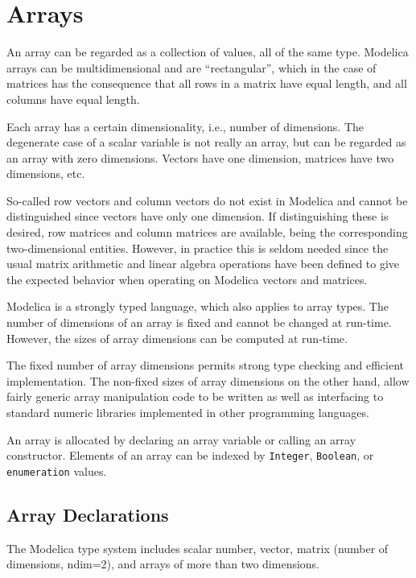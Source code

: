 \chapter{Arrays}\label{arrays}

An array can be regarded as a collection of values, all of the same
type. Modelica arrays can be multidimensional and are ``rectangular'',
which in the case of matrices has the consequence that all rows in a
matrix have equal length, and all columns have equal length.

Each array has a certain dimensionality, i.e., number of dimensions. The
degenerate case of a scalar variable is not really an array, but can be
regarded as an array with zero dimensions. Vectors have one dimension,
matrices have two dimensions, etc.


So-called row vectors and column vectors do not exist in Modelica and cannot be distinguished since vectors have only one
dimension.  If distinguishing these is desired, row matrices and column matrices are available, being the corresponding
two-dimensional entities.  However, in practice this is seldom needed since the usual matrix arithmetic and linear algebra
operations have been defined to give the expected behavior when operating on Modelica vectors and matrices.

Modelica is a strongly typed language, which also applies to array
types. The number of dimensions of an array is fixed and cannot be
changed at run-time. However, the sizes of array dimensions can
be computed at run-time.

The fixed number of array dimensions permits strong type checking and efficient implementation.  The non-fixed sizes of array
dimensions on the other hand, allow fairly generic array manipulation code to be written as well as interfacing to standard
numeric libraries implemented in other programming languages.

An array is allocated by declaring an array variable or calling an array
constructor. Elements of an array can be indexed by \lstinline!Integer!, \lstinline!Boolean!, or
\lstinline!enumeration! values.

\section{Array Declarations}\label{array-declarations}

The Modelica type system includes scalar number, vector, matrix (number
of dimensions, ndim=2), and arrays of more than two dimensions.

